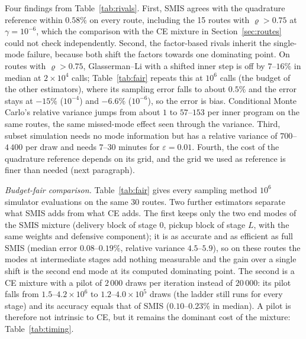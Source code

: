 \documentclass[11pt]{article}
\theoremstyle{definition}
\theoremstyle{remark}
\begin{document}
Four findings from Table~\ref{tab:rivals}. First, SMIS agrees with the
quadrature reference within $0.58\%$ on every route, including the 15 routes
with $\varrho>0.75$ at $\gamma=10^{-6}$, which the comparison with the CE
mixture in Section~\ref{sec:routes} could not check independently. Second,
the factor-based rivals inherit the single-mode failure, because both shift
the factors towards one dominating point. On routes with $\varrho>0.75$,
Glasserman--Li with a shifted inner step is off by $7$--$16\%$ in median at
$2\times10^4$ calls; Table~\ref{tab:fair} repeats this at $10^6$ calls (the
budget of the other estimators), where its sampling error falls to about
$0.5\%$ and the error stays at $-15\%$ ($10^{-4}$) and $-6.6\%$ ($10^{-6}$),
so the error is bias. Conditional Monte Carlo's relative variance jumps from
about $1$ to $57$--$153$ per inner program on the same routes, the same
missed-mode effect seen through the variance. Third, subset simulation needs
no mode information but has a relative variance of $700$--$4\,400$ per draw
and needs $7$--$30$ minutes for $\varepsilon=0.01$. Fourth, the cost of the
quadrature reference depends on its grid, and the grid we used as reference is
finer than needed (next paragraph).

\emph{Budget-fair comparison.} Table~\ref{tab:fair} gives every sampling
method $10^6$ simulator evaluations on the same 30 routes. Two further
estimators separate what SMIS adds from what CE adds. The first keeps only the
two end modes of the SMIS mixture (delivery block of stage $0$, pickup block of
stage $L$, with the same weights and defensive component); it is as accurate
and as efficient as full SMIS (median error $0.08$--$0.19\%$, relative
variance $4.5$--$5.9$), so on these routes the modes at intermediate stages
add nothing measurable and the gain over a single shift is the second end mode
at its computed dominating point. The second is a CE mixture with a pilot of
$2\,000$ draws per iteration instead of $20\,000$: its pilot falls from
$1.5$--$4.2\times10^6$ to $1.2$--$4.0\times10^5$ draws (the ladder still runs
for every stage) and its accuracy equals that of SMIS
($0.10$--$0.23\%$ in median). A pilot is therefore not intrinsic to CE, but
it remains the dominant cost of the mixture: Table~\ref{tab:timing}.
\end{document}
